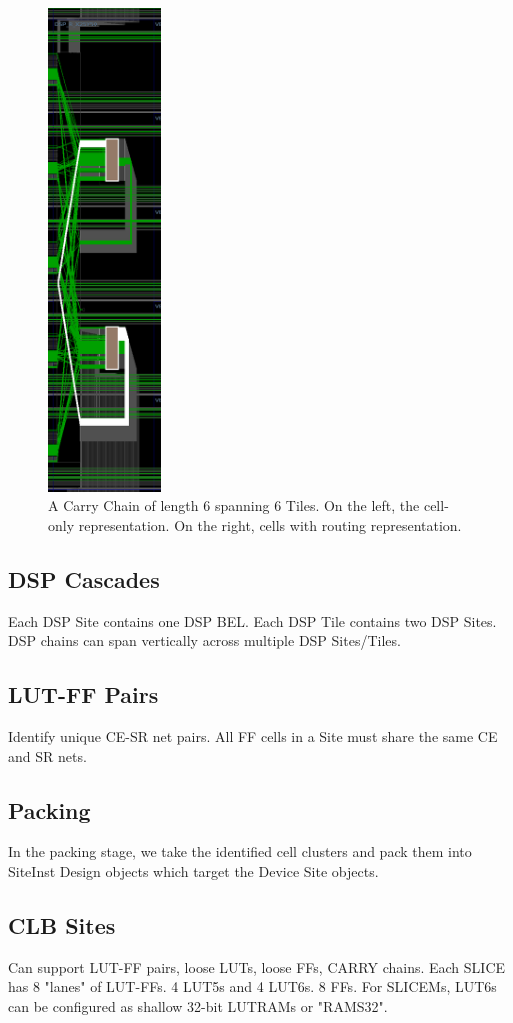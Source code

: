 \documentclass[twocolumn]{article}
\begin{document}
\begin{figure}
                \includegraphics[width=3.0cm]{figures/dsp_cascade_routes.png}
                \caption{A Carry Chain of length 6 spanning 6 Tiles. On the left, the cell-only representation. On the right, cells with routing representation.}
                \label{fig:device_carry_chain_routing}
            \end{figure}
        \subsection{DSP Cascades}
            Each DSP Site contains one DSP BEL.
            Each DSP Tile contains two DSP Sites.
            DSP chains can span vertically across multiple DSP Sites/Tiles.

        \subsection{LUT-FF Pairs}
            Identify unique CE-SR net pairs. All FF cells in a Site must share the same CE and SR nets.
    \subsection{Packing}
        In the packing stage, we take the identified cell clusters and pack them into SiteInst Design objects which target the Device Site objects.
        \subsection{CLB Sites}
            Can support LUT-FF pairs, loose LUTs, loose FFs, CARRY chains.
            Each SLICE has 8 "lanes" of LUT-FFs. 4 LUT5s and 4 LUT6s. 8 FFs.
            For SLICEMs, LUT6s can be configured as shallow 32-bit LUTRAMs or "RAMS32".
\end{document}
